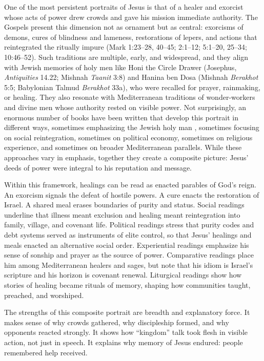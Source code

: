 One of the most persistent portraits of Jesus is that of a healer and exorcist whose acts of power drew crowds and gave his mission immediate authority.
The Gospels present this dimension not as ornament but as central: exorcisms of demons, cures of blindness and lameness, restorations of lepers, and actions that reintegrated the ritually impure (Mark 1:23--28, 40--45; 2:1--12; 5:1--20, 25--34; 10:46--52).
Such traditions are multiple, early, and widespread, and they align with Jewish memories of holy men like Honi the Circle Drawer (Josephus, \emph{Antiquities} 14.22; Mishnah \emph{Taanit} 3:8) and Hanina ben Dosa (Mishnah \emph{Berakhot} 5:5; Babylonian Talmud \emph{Berakhot} 33a), who were recalled for prayer, rainmaking, or healing.
They also resonate with Mediterranean traditions of wonder-workers and divine men whose authority rested on visible power.
Not surprisingly, an enormous number of books have been written that develop this portrait in different ways, sometimes emphasizing the Jewish holy man \cite{vermes:jesus}, sometimes focusing on social reintegration, sometimes on political economy, sometimes on religious experience, and sometimes on broader Mediterranean parallels.
While these approaches vary in emphasis, together they create a composite picture: Jesus’ deeds of power were integral to his reputation and message.

Within this framework, healings can be read as enacted parables of God’s reign.
An exorcism signals the defeat of hostile powers.
A cure enacts the restoration of Israel.
A shared meal erases boundaries of purity and status.
Social readings underline that illness meant exclusion and healing meant reintegration into family, village, and covenant life.
Political readings stress that purity codes and debt systems served as instruments of elite control, so that Jesus’ healings and meals enacted an alternative social order.
Experiential readings emphasize his sense of sonship and prayer as the source of power.
Comparative readings place him among Mediterranean healers and sages, but note that his idiom is Israel’s scripture and his horizon is covenant renewal.
Liturgical readings show how stories of healing became rituals of memory, shaping how communities taught, preached, and worshiped.

The strengths of this composite portrait are breadth and explanatory force.
It makes sense of why crowds gathered, why discipleship formed, and why opponents reacted strongly.
It shows how “kingdom” talk took flesh in visible action, not just in speech.
It explains why memory of Jesus endured: people remembered help received.

